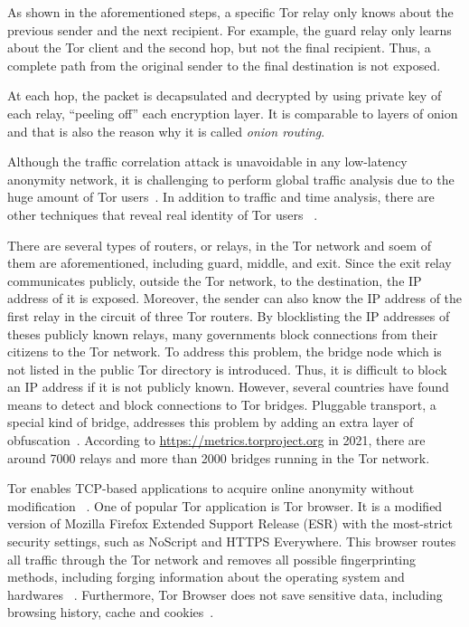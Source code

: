 As shown in the aforementioned steps, a specific Tor relay only knows about the previous
sender and the next recipient. For example, the guard relay only learns about the Tor client
and the second hop, but not the final recipient. Thus, a complete path from the original
sender to the final destination is not exposed.

At each hop, the packet is decapsulated and decrypted by using private key of each relay,
``peeling off'' each encryption layer. It is comparable to layers of onion and that is also
the reason why it is called \emph{onion routing}.

Although the traffic correlation attack is unavoidable in any low-latency anonymity
network, it is challenging to perform global traffic analysis due to the huge amount
of Tor users~\cite{dis:anonymity_system,paper:tor_design}. In addition to traffic and
time analysis, there are other techniques that reveal real identity of Tor users
~\cite{paper:de_tor}.

There are several types of routers, or relays, in the Tor network and soem of them
are aforementioned, including guard, middle, and exit. Since the exit relay communicates
publicly, outside the Tor network, to the destination, the IP address of it is exposed.
Moreover, the sender can also know the IP address of the first relay in the circuit of
three Tor routers.
By blocklisting the IP addresses of theses publicly known relays, many governments block
connections from their citizens to the Tor network. To address this problem, the bridge
node which is not listed in the public Tor directory is introduced. Thus, it is difficult
to block an IP address if it is not publicly known. However, several countries have
found means to detect and block connections to Tor bridges. Pluggable transport, a
special kind of bridge, addresses this problem by adding an extra layer
of obfuscation~\cite{web:relay_types}. According to \url{https://metrics.torproject.org}
in 2021, there are around 7000 relays and more than 2000 bridges running in the Tor
network.

Tor enables TCP-based applications to acquire online anonymity without modification
~\cite{paper:tor_design}. One of popular Tor application is Tor browser. It is
a modified version of Mozilla Firefox Extended Support Release (ESR) with the most-strict
security settings, such as NoScript and HTTPS Everywhere. This browser routes all
traffic through the Tor network and removes all possible fingerprinting methods,
including forging information about the operating system and hardwares
~\cite{dis:usage_of_onion_services}.
Furthermore, Tor Browser does not save sensitive data, including browsing history,
cache and cookies~\cite{dis:usage_of_onion_services}.

